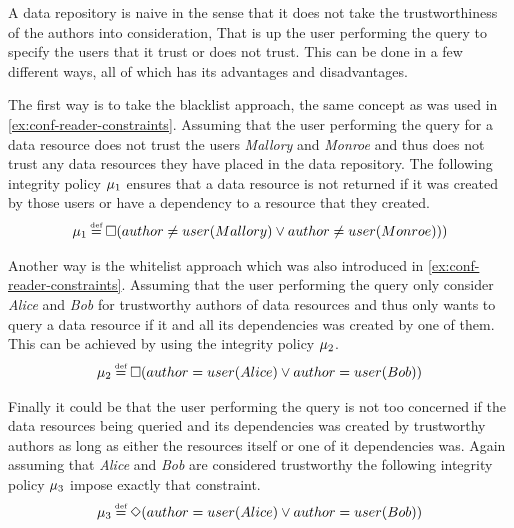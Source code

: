 \begin{example}
A data repository is naive in the sense that it does not take the trustworthiness of the authors into consideration, That is up the user performing the query to specify the users that it trust or does not trust. This can be done in a few different ways, all of which has its advantages and disadvantages.

The first way is to take the blacklist approach, the same concept as was used in \autoref{ex:conf-reader-constraints}. Assuming that the user performing the query for a data resource does not trust the users \emph{Mallory} and \emph{Monroe} and thus does not trust any data resources they have placed in the data repository. The following integrity policy $\mu_1$ ensures that a data resource is not returned if it was created by those users or have a dependency to a resource that they created.
\begin{align*}
    \inte_1 \eqdef \G( author \neq user(Mallory) \lor author \neq user(Monroe)))
\end{align*}

Another way is the whitelist approach which was also introduced in \autoref{ex:conf-reader-constraints}. Assuming that the user performing the query only consider \emph{Alice} and \emph{Bob} for trustworthy authors of data resources and thus only wants to query a data resource if it and all its dependencies was created by one of them. This can be achieved by using the integrity policy $\mu_2$.
\begin{align*}
    \inte_2 \eqdef \G(author = user(Alice) \lor author = user(Bob))
\end{align*}

Finally it could be that the user performing the query is not too concerned if the data resources being queried and its dependencies was created by trustworthy authors as long as either the resources itself or one of it dependencies was. Again assuming that \emph{Alice} and \emph{Bob} are considered trustworthy the following integrity policy $\mu_3$ impose exactly that constraint.
\begin{align*}
    \inte_3 \eqdef \F(author = user(Alice) \lor author = user(Bob))
\end{align*}
\end{example}